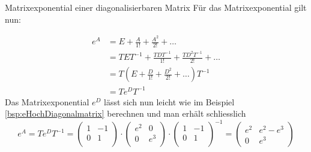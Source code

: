 \begin{bsp}{Matrixexponential einer diagonalisierbaren Matrix}{}
	Für das Matrixexponential gilt nun:

	\begin{align*}
		e^A & = E + \frac{A}{1!} + \frac{A^2}{2!} + \dots                      \\
		    & = TET^{-1} + \frac{TDT^{-1}}{1!} + \frac{TD^2T^{-1}}{2!} + \dots \\
		    & = T\left(E + \frac{D}{1!} + \frac{D^2}{2!} + \dots\right) T^{-1} \\
		    & = T e^D T^{-1}
	\end{align*}
	Das Matrixexponential $e^D$ lässt sich nun leicht wie im Beispiel \ref*{bsp:eHochDiagonalmatrix} berechnen und man erhält schliesslich
	$$
		e^A = T e^D T^{-1} = \begin{pmatrix}
			1 & -1 \\
			0 & 1  \\
		\end{pmatrix} \cdot
		\begin{pmatrix}
			e^2 & 0   \\
			0   & e^3 \\
		\end{pmatrix}\cdot
		\begin{pmatrix}
			1 & -1 \\
			0 & 1  \\
		\end{pmatrix}^{-1} = \begin{pmatrix}
			e^2 & e^2-e^3 \\
			0   & e^3
		\end{pmatrix}
	$$

\end{bsp}
\clearpage
